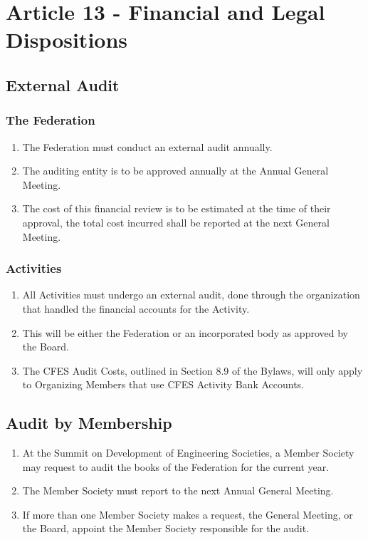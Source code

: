 \section{Article 13 - Financial and Legal Dispositions}
\label{article-13-financial-and-legal-dispositions}

\subsection{External Audit}
\label{external-audit}

\subsubsection{The Federation}
\label{the-federation-audit}

\begin{enumerate}
 \item The Federation must conduct an external audit annually.
 \item The auditing entity is to be approved annually at the Annual General Meeting.
 \item The cost of this financial review is to be estimated at the time of their approval, the total cost incurred shall be reported at the next General Meeting.
\end{enumerate}

\subsubsection{Activities}
\label{activities}

\begin{enumerate}
 \item All Activities must undergo an external audit, done through the organization that handled the financial accounts for the Activity.
 \item This will be either the Federation or an incorporated body as approved by the Board.
 \item The CFES Audit Costs, outlined in Section 8.9 of the Bylaws, will only apply to Organizing Members that use CFES Activity Bank Accounts.
\end{enumerate}

\subsection{Audit by Membership}
\label{audit-by-membership}

\begin{enumerate}
 \item At the Summit on Development of Engineering Societies, a Member Society may request to audit the books of the Federation for the current year.
 \item The Member Society must report to the next Annual General Meeting.
 \item If more than one Member Society makes a request, the General Meeting, or the Board, appoint the Member Society responsible for the audit.
\end{enumerate}

